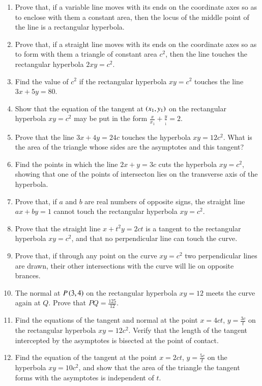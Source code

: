 \renewcommand{\theequation}{\theenumi}
\begin{enumerate}[label=\arabic*.,ref=\thesubsection.\theenumi]
\item Prove that, if a variable line moves with its ends on the coordinate axes so as
to enclose with them a constant area, then the locus of the middle point of the line
is a rectangular hyperbola.
\item Prove that, if a straight line moves with its ends on the coordinate axes so as
to form with them a triangle of constant area $c^2$, then the line touches the rectangular
hyperbola $2xy=c^2$.
\item Find the value of $c^2$ if the rectangular hyperbola $xy=c^2$ touches the line $3x+5y=80$.
\item Show that the equation of the tangent at $\left(x_1,y_1\right)$  on the rectangular hyperbola
$xy=c^2$ may be put in the form $\frac{x}{x_1}+\frac{y}{_1} = 2$.
\item Prove that the line $3x+4y=24c$ touches the hyperbola $xy=12c^2$.  What is the area of the 
triangle whose sides are the asymptotes and this tangent?
\item Find the points in which the line $2x+y=3c$ cuts the hyperbola $xy=c^2$, showing that
one of the points of intersecton lies on the transverse axis of the hyperbola.
\item Prove that, if $a$ and $b$ are real numbers of opposite signs, the straight line
$ax+by=1$ cannot touch the rectangular hyperbola $xy=c^2$.
\item Prove that the straight line $x+t^2y=2ct$ is a tangent to the rectangular hyperbola
$xy=c^2$, and that no perpendicular line can touch the curve.
\item Prove that, if through any point on the curve $xy=c^2$ two perpendicular lines
are drawn, their other intersections with the curve will lie on opposite
brances.
\item The normal at $P \left(3,4\right)$ on the rectangular hyperbola $xy=12$ meets the curve again at $Q$.
Prove that $PQ = \frac{125}{12}$.
\item Find the equations of the tangent and normal at the point $x=4ct$, $y=\frac{3c}{t}$ on the rectangular
hyperbola $xy=12c^2$.  Verify that the length of the tangent intercepted by the asymptotes is bisected
at the point of contact.
\item Find the equation of the tangent at the point $x=2ct$, $y=\frac{5c}{t}$ on the hyperbola $xy=10c^2$, and show 
that the area of the triangle the tangent forms with the asymptotes is independent of $t$.

\end{enumerate}
